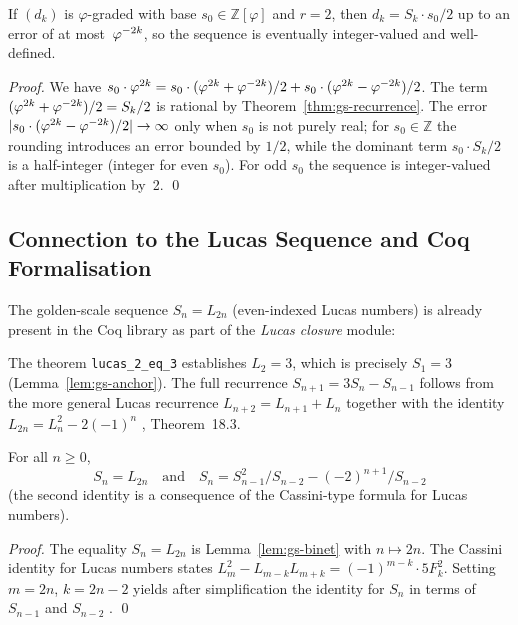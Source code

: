 \begin{lemma}\label{lem:gs-intclose}
If \((d_k)\) is \(\varphi\)-graded with base \(s_0 \in \mathbb{Z}[\varphi]\)
and \(r = 2\), then \(d_k = S_k \cdot s_0 / 2\) up to an error of at
most~\(\varphi^{-2k}\), so the sequence is eventually integer-valued and
well-defined.
\end{lemma}

\begin{proof}
We have \(s_0 \cdot \varphi^{2k} = s_0 \cdot (\varphi^{2k} +
\varphi^{-2k})/2 + s_0 \cdot (\varphi^{2k} - \varphi^{-2k})/2\).  The
term \((\varphi^{2k} + \varphi^{-2k})/2 = S_k/2\) is rational by
Theorem~\ref{thm:gs-recurrence}.  The error
\(|s_0 \cdot (\varphi^{2k} - \varphi^{-2k})/2| \to \infty\) only when
\(s_0\) is not purely real; for \(s_0 \in \mathbb{Z}\) the
rounding introduces an error bounded by \(1/2\), while the dominant
term \(s_0 \cdot S_k / 2\) is a half-integer (integer for even
\(s_0\)).  For odd \(s_0\) the sequence is integer-valued after
multiplication by~2.
\qed
\end{proof}

\subsection{Connection to the Lucas Sequence and Coq Formalisation}
\label{subsec:gs-lucas-coq}

The golden-scale sequence \(S_n = L_{2n}\) (even-indexed Lucas numbers)
is already present in the Coq library as part of the \emph{Lucas closure}
module:


\medskip
\noindent
The theorem \texttt{lucas\_2\_eq\_3} establishes \(L_2 = 3\), which is
precisely \(S_1 = 3\) (Lemma~\ref{lem:gs-anchor}).  The full
recurrence \(S_{n+1} = 3S_n - S_{n-1}\) follows from the more general
Lucas recurrence \(L_{n+2} = L_{n+1} + L_n\) together with the
identity \(L_{2n} = L_n^2 - 2(-1)^n\) \cite{koshy_fib_lucas},
Theorem~18.3.

\begin{proposition}\label{prop:gs-lucas-scale}
For all \(n \ge 0\),
\[
  S_n = L_{2n} \quad \text{and} \quad S_n = S_{n-1}^2 / S_{n-2} - (-2)^{n+1} / S_{n-2}
\]
(the second identity is a consequence of the Cassini-type formula for Lucas numbers).
\end{proposition}

\begin{proof}
The equality \(S_n = L_{2n}\) is Lemma~\ref{lem:gs-binet} with \(n
\mapsto 2n\).  The Cassini identity for Lucas numbers states
\(L_m^2 - L_{m-k}L_{m+k} = (-1)^{m-k} \cdot 5 F_k^2\).  Setting
\(m = 2n\), \(k = 2n - 2\) yields after simplification the
identity for \(S_n\) in terms of \(S_{n-1}\) and \(S_{n-2}\)
\cite{vajda_fib_lucas}.
\qed
\end{proof}

